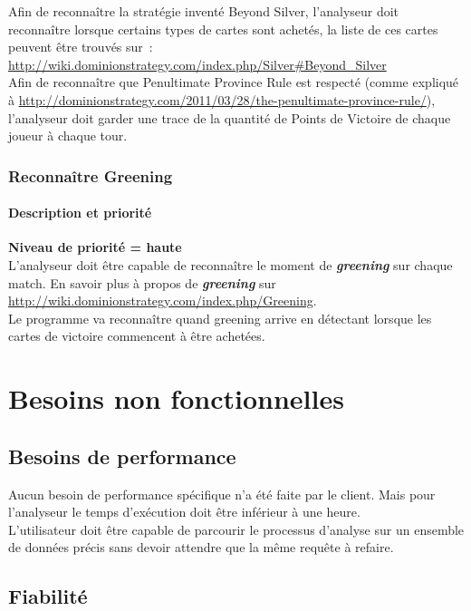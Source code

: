 \documentclass{scrreprt}
\begin{document}
Afin de reconnaître la stratégie inventé Beyond Silver, l'analyseur doit reconnaître lorsque certains types de cartes sont achetés, la liste de ces cartes peuvent être trouvés sur : \url{http://wiki.dominionstrategy.com/index.php/Silver#Beyond_Silver}\\

Afin de reconnaître que Penultimate Province Rule est respecté (comme expliqué à \url{http://dominionstrategy.com/2011/03/28/the-penultimate-province-rule/}), l’analyseur doit garder une trace de la quantité de Points de Victoire de chaque joueur à chaque tour.

\subsection{Reconnaître Greening}
\subsubsection{Description et priorité}
\textbf{Niveau de priorité = haute}\\

L'analyseur doit être capable de reconnaître le moment de \textit{\textbf{greening}} sur chaque match.
En savoir plus à propos de \textit{\textbf{greening}} sur \url{http://wiki.dominionstrategy.com/index.php/Greening}.\\
Le programme va reconnaître quand greening arrive en détectant lorsque les cartes de victoire commencent à être achetées.

\chapter{Besoins non fonctionnelles }
\section{Besoins de performance}

Aucun besoin de performance spécifique n’a été faite par le client. Mais pour l'analyseur le temps d’exécution  doit être inférieur à une heure.\\
L'utilisateur doit être capable de parcourir le processus d'analyse sur un ensemble de données précis sans devoir attendre que la même requête à refaire.

\section{Fiabilité}
\end{document}
